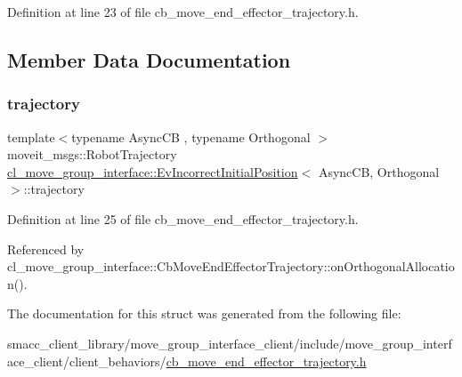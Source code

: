Definition at line 23 of file cb\+\_\+move\+\_\+end\+\_\+effector\+\_\+trajectory.\+h.



\subsection{Member Data Documentation}
\mbox{\label{structcl__move__group__interface_1_1EvIncorrectInitialPosition_a5e8e161fe0d22db3bd7b4d71fae3f23d}} 
\subsubsection{\texorpdfstring{trajectory}{trajectory}}
{\footnotesize\ttfamily template$<$typename Async\+CB , typename Orthogonal $>$ \\
moveit\+\_\+msgs\+::\+Robot\+Trajectory \hyperlink{structcl__move__group__interface_1_1EvIncorrectInitialPosition}{cl\+\_\+move\+\_\+group\+\_\+interface\+::\+Ev\+Incorrect\+Initial\+Position}$<$ Async\+CB, Orthogonal $>$\+::trajectory}



Definition at line 25 of file cb\+\_\+move\+\_\+end\+\_\+effector\+\_\+trajectory.\+h.



Referenced by cl\+\_\+move\+\_\+group\+\_\+interface\+::\+Cb\+Move\+End\+Effector\+Trajectory\+::on\+Orthogonal\+Allocation().



The documentation for this struct was generated from the following file\+:\begin{DoxyCompactItemize}
\item 
smacc\+\_\+client\+\_\+library/move\+\_\+group\+\_\+interface\+\_\+client/include/move\+\_\+group\+\_\+interface\+\_\+client/client\+\_\+behaviors/\hyperlink{cb__move__end__effector__trajectory_8h}{cb\+\_\+move\+\_\+end\+\_\+effector\+\_\+trajectory.\+h}\end{DoxyCompactItemize}
